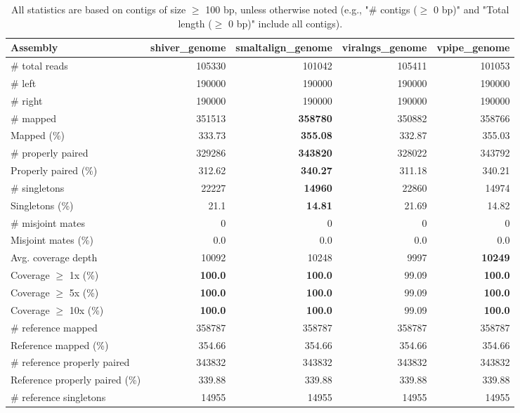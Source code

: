 \documentclass[12pt,a4paper]{article}
\begin{document}
\begin{table}[ht]
\begin{center}
\caption{All statistics are based on contigs of size $\geq$ 100 bp, unless otherwise noted (e.g., "\# contigs ($\geq$ 0 bp)" and "Total length ($\geq$ 0 bp)" include all contigs).}
\begin{tabular}{|l*{4}{|r}|}
\hline
Assembly & shiver\_genome & smaltalign\_genome & viralngs\_genome & vpipe\_genome \\ \hline
\# total reads & 105330 & 101042 & 105411 & 101053 \\ \hline
\# left & 190000 & 190000 & 190000 & 190000 \\ \hline
\# right & 190000 & 190000 & 190000 & 190000 \\ \hline
\# mapped & 351513 & {\bf 358780} & 350882 & 358766 \\ \hline
Mapped (\%) & 333.73 & {\bf 355.08} & 332.87 & 355.03 \\ \hline
\# properly paired & 329286 & {\bf 343820} & 328022 & 343792 \\ \hline
Properly paired (\%) & 312.62 & {\bf 340.27} & 311.18 & 340.21 \\ \hline
\# singletons & 22227 & {\bf 14960} & 22860 & 14974 \\ \hline
Singletons (\%) & 21.1 & {\bf 14.81} & 21.69 & 14.82 \\ \hline
\# misjoint mates & 0 & 0 & 0 & 0 \\ \hline
Misjoint mates (\%) & 0.0 & 0.0 & 0.0 & 0.0 \\ \hline
Avg. coverage depth & 10092 & 10248 & 9997 & {\bf 10249} \\ \hline
Coverage $\geq$ 1x (\%) & {\bf 100.0} & {\bf 100.0} & 99.09 & {\bf 100.0} \\ \hline
Coverage $\geq$ 5x (\%) & {\bf 100.0} & {\bf 100.0} & 99.09 & {\bf 100.0} \\ \hline
Coverage $\geq$ 10x (\%) & {\bf 100.0} & {\bf 100.0} & 99.09 & {\bf 100.0} \\ \hline
\# reference mapped & 358787 & 358787 & 358787 & 358787 \\ \hline
Reference mapped (\%) & 354.66 & 354.66 & 354.66 & 354.66 \\ \hline
\# reference properly paired & 343832 & 343832 & 343832 & 343832 \\ \hline
Reference properly paired (\%) & 339.88 & 339.88 & 339.88 & 339.88 \\ \hline
\# reference singletons & 14955 & 14955 & 14955 & 14955 \\ \hline

\end{tabular}
\end{center}
\end{table}
\end{document}
